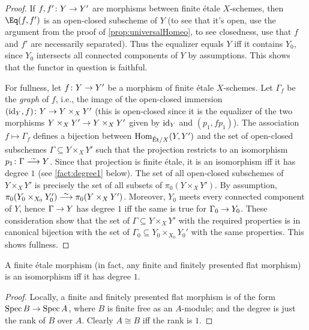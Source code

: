 \documentclass[a4paper, 10pt, oneside, DIV=9, chapterprefix=true, numbers=enddot, bibliography=totoc]{scrbook}
\begin{document}
\begin{proof}
	If $f,f'\colon Y\morphism Y'$ are morphisms between finite étale $X$-schemes, then $\Eq(f,f')$ is an open-closed subscheme of $Y$ (to see that it's open, use the argument from the proof of \cref{prop:universalHomeo}, to see closedness, use that $f$ and $f'$ are necessarily separated). Thus the equalizer equals $Y$ iff it contains $Y_0$, since $Y_0$ intersects all  connected components of $Y$ by assumptions. This shows that the functor in question is faithful.
	
	For fullness, let $f\colon Y\morphism Y'$ be a morphism of finite étale $X$-schemes. Let $\Gamma_f$ be the \emph{graph} of $f$, i.e., the image of the open-closed immersion $(\id_Y,f)\colon Y\morphism Y\times_XY'$ (this is open-closed since it is the equalizer of the two morphisms $Y\times_XY'\morphism Y\times_XY'$ given by $\operatorname{id}_Y$ and $(p_1,fp_1)$). The association $f\mapsto \Gamma_f$ defines a bijection between $\operatorname{Hom}_{\mathrm{\acute{E}t}/X}(Y,Y')$ and the set of open-closed subschemes $\Gamma\subseteq Y\times_XY'$ such that the projection restricts to an isomorphism $p_1\colon \Gamma\isomorphism Y$. Since that projection is finite étale, it is an isomorphism iff it has degree $1$ (see \cref{fact:degree1} below). The set of all open-closed subschemes of $Y\times_XY'$ is precisely the set of all subsets of $\pi_0(Y\times_XY')$. By assumption, $\pi_0(Y_0\times_{X_0}Y'_0)\isomorphism \pi_0(Y\times_XY')$. Moreover, $Y_0$ meets every connected component of $Y$, hence $\Gamma\morphism Y$ has degree $1$ iff the same is true for $\Gamma_0\morphism Y_0$. These consideration show that the set of $\Gamma\subseteq Y\times_XY'$ with the required properties is in canonical bijection with the set of $\Gamma_0\subseteq Y_0\times_{X_0}Y_0'$ with the same properties. This shows fullness.
\end{proof}
\begin{fact}\label{fact:degree1}
	A finite étale morphism (in fact, any finite and finitely presented flat morphism) is an isomorphism iff it has degree $1$.
\end{fact}
\begin{proof}
	Locally, a finite and finitely presented flat morphism is of the form $\Spec B\morphism \Spec A$, where $B$ is finite free as an $A$-module; and the degree is just the rank of $B$ over $A$. Clearly $A\cong B$ iff the rank is $1$.
\end{proof}
\end{document}
